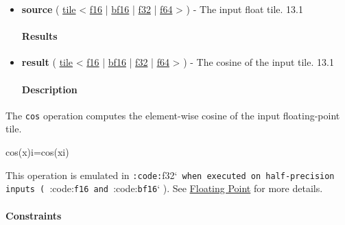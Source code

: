 \documentclass{article}
\begin{document}
\begin{itemize}
\item \textbf{source} ( \href{https://docs.nvidia.com/cuda/tile-ir/latest/sections/types.html#type-tile}{tile} < \href{https://docs.nvidia.com/cuda/tile-ir/latest/sections/types.html#subsection-element-types}{f16} | \href{https://docs.nvidia.com/cuda/tile-ir/latest/sections/types.html#subsection-element-types}{bf16} | \href{https://docs.nvidia.com/cuda/tile-ir/latest/sections/types.html#subsection-element-types}{f32} | \href{https://docs.nvidia.com/cuda/tile-ir/latest/sections/types.html#subsection-element-types}{f64} > ) - The input float tile. 13.1


\paragraph{Results}

\item \textbf{result} ( \href{https://docs.nvidia.com/cuda/tile-ir/latest/sections/types.html#type-tile}{tile} < \href{https://docs.nvidia.com/cuda/tile-ir/latest/sections/types.html#subsection-element-types}{f16} | \href{https://docs.nvidia.com/cuda/tile-ir/latest/sections/types.html#subsection-element-types}{bf16} | \href{https://docs.nvidia.com/cuda/tile-ir/latest/sections/types.html#subsection-element-types}{f32} | \href{https://docs.nvidia.com/cuda/tile-ir/latest/sections/types.html#subsection-element-types}{f64} > ) - The cosine of the input tile. 13.1


\paragraph{Description}

\end{itemize}
The \texttt{cos} operation computes the element-wise cosine of the input floating-point tile.


cos(x)i=cos(xi)

This operation is emulated in \texttt{:code:}f32`\texttt{ when executed on half-precision inputs ( }:code:\texttt{f16}\texttt{ and }:code:\texttt{bf16}` ). See \href{https://docs.nvidia.com/cuda/tile-ir/latest/sections/operations.html#op-group-floating-point}{Floating Point} for more details.



\paragraph{Constraints}
\end{document}
